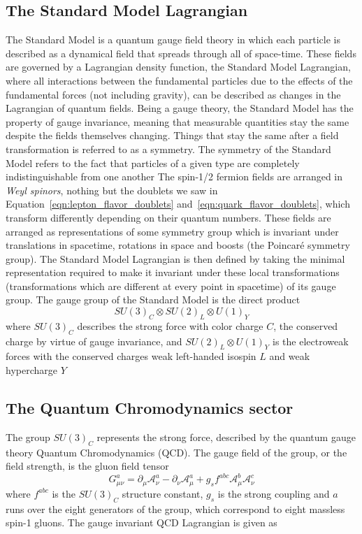 \subsection{The Standard Model Lagrangian}
\label{sec:theory:gauge}
The Standard Model is a quantum gauge field theory in which each particle is described as a dynamical field that spreads through all of space-time. These fields are governed by a Lagrangian density function, the Standard Model Lagrangian, where all interactions between the fundamental particles due to the effects of the fundamental forces (not including gravity), can be described as changes in the Lagrangian of quantum fields.\newline
Being a gauge theory, the Standard Model has the property of gauge invariance, meaning that measurable quantities stay the same despite the fields themselves changing. Things that stay the same after a field transformation is referred to as a symmetry. The symmetry of the Standard Model refers to the fact that particles of a given type are completely indistinguishable from one another The spin-1/2 fermion fields are arranged in \emph{Weyl spinors}, nothing but the doublets we saw in Equation~\ref{eqn:lepton_flavor_doublets} and~\ref{eqn:quark_flavor_doublets}, which transform differently depending on their quantum numbers. These fields are arranged as representations of some symmetry group which is invariant under translations in spacetime, rotations in space and boosts (the Poincaré symmetry group). The Standard Model Lagrangian is then defined by taking the minimal representation required to make it invariant under these local transformations (transformations which are different at every point in spacetime) of its gauge group. The gauge group of the Standard Model is the direct product
\begin{equation}
  SU(3)_C \otimes SU (2)_L \otimes U(1)_Y
\end{equation}
where $SU(3)_C$ describes the strong force with color charge $C$, the conserved charge by virtue of gauge invariance, and $SU (2)_L \otimes U(1)_Y$ is the electroweak forces with the conserved charges weak left-handed isospin $L$ and weak hypercharge $Y$

\subsection{The Quantum Chromodynamics sector}
\label{sec:theory:qcd}
The group $SU(3)_C$ represents the strong force, described by the quantum gauge theory Quantum Chromodynamics (QCD). The gauge field of the group, or the field strength, is the gluon field tensor 
\begin{equation}
G_{\mu\nu}^a=\partial_{\mu} \mathcal{A}_{\nu}^a-\partial_{\nu} \mathcal{A}_{\mu}^a+g_s f^{abc}\mathcal{A}_{\mu}^b\mathcal{A}_{\nu}^c
\end{equation}
where $f^{abc}$ is the $SU(3)_C$ structure constant, $g_s$ is the strong coupling and $a$ runs over the eight generators of the group, which correspond to eight massless spin-1 gluons. The gauge invariant QCD Lagrangian is given as


